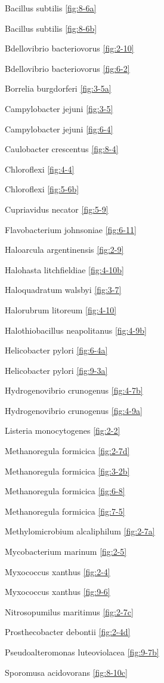 \documentclass[]{tufte-book}
\begin{document}
Bacillus subtilis \ref{fig:8-6a}

Bacillus subtilis \ref{fig:8-6b}

Bdellovibrio bacteriovorus \ref{fig:2-10}

Bdellovibrio bacteriovorus \ref{fig:6-2}

Borrelia burgdorferi \ref{fig:3-5a}

Campylobacter jejuni \ref{fig:3-5}

Campylobacter jejuni \ref{fig:6-4}

Caulobacter crescentus \ref{fig:8-4}

Chloroflexi \ref{fig:4-4}

Chloroflexi \ref{fig:5-6b}

Cupriavidus necator \ref{fig:5-9}

Flavobacterium johnsoniae \ref{fig:6-11}

Haloarcula argentinensis \ref{fig:2-9}

Halohasta litchfieldiae \ref{fig:4-10b}

Haloquadratum walsbyi \ref{fig:3-7}

Halorubrum litoreum \ref{fig:4-10}

Halothiobacillus neapolitanus \ref{fig:4-9b}

Helicobacter pylori \ref{fig:6-4a}

Helicobacter pylori \ref{fig:9-3a}

Hydrogenovibrio crunogenus \ref{fig:4-7b}

Hydrogenovibrio crunogenus \ref{fig:4-9a}

Listeria monocytogenes \ref{fig:2-2}

Methanoregula formicica \ref{fig:2-7d}

Methanoregula formicica \ref{fig:3-2b}

Methanoregula formicica \ref{fig:6-8}

Methanoregula formicica \ref{fig:7-5}

Methylomicrobium alcaliphilum \ref{fig:2-7a}

Mycobacterium marinum \ref{fig:2-5}

Myxococcus xanthus \ref{fig:2-4}

Myxococcus xanthus \ref{fig:9-6}

Nitrosopumilus maritimus \ref{fig:2-7c}

Prosthecobacter debontii \ref{fig:2-4d}

Pseudoalteromonas luteoviolacea \ref{fig:9-7b}

Sporomusa acidovorans \ref{fig:8-10c}
\end{document}
